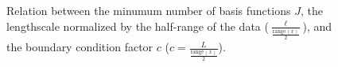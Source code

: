 \documentclass[]{interact}
\theoremstyle{plain}%
\theoremstyle{definition}
\theoremstyle{remark}
\begin{document}
\begin{figure}[H]
\centering
{}
\caption{Relation between the minumum number of basis functions $J$, the lengthscale normalized by the half-range of the data ($\frac{\ell}{\frac{\text{range}(x)}{2}}$), and the boundary condition factor $c$ ($c = \frac{L}{\frac{\text{range}(x)}{2}}$).}
  \label{fig3_lscale_vs_J_vs_c_part1}
\end{figure}
\end{document}
